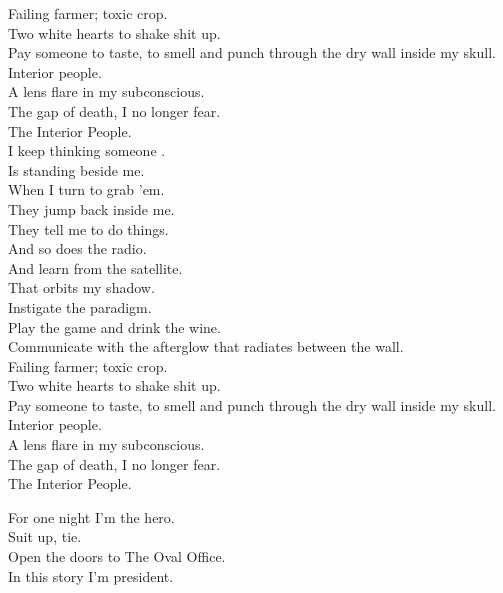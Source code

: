 Failing farmer; toxic crop. \\
Two white hearts to shake shit up. \\
Pay someone to taste, to smell and punch through the dry wall inside my skull. \\

Interior people. \\
A lens flare in my subconscious. \\
The gap of death, I no longer fear. \\
The Interior People. \\

I keep thinking someone .\\
Is standing beside me. \\
When I turn to grab 'em. \\
They jump back inside me. \\
They tell me to do things. \\
And so does the radio. \\
And learn from the satellite. \\
That orbits my shadow. \\

Instigate the paradigm. \\
Play the game and drink the wine. \\
Communicate with the afterglow that radiates between the wall. \\

Failing farmer; toxic crop. \\
Two white hearts to shake shit up. \\
Pay someone to taste, to smell and punch through the dry wall inside my skull. \\

Interior people. \\
A lens flare in my subconscious. \\
The gap of death, I no longer fear. \\
The Interior People. \\




For one night I'm the hero. \\
Suit up, tie. \\
Open the doors to The Oval Office. \\
In this story I'm president. \\

